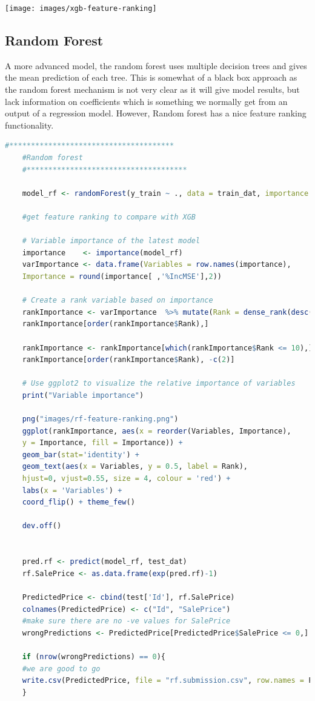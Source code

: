 \documentclass[sigconf]{acmart}
\begin{document}
	\begin{center}		
		\texttt{[image: images/xgb-feature-ranking]}	
	\end{center}
	
	\subsection{Random Forest}

	A more advanced model, the random forest uses multiple decision trees and gives the mean prediction of each tree. This is somewhat of a black box approach as the random forest mechanism is not very clear as it will give model results, but lack information on coefficients which is something we normally get from an output of a regression model. However, Random forest has a nice feature ranking functionality.
	
	\begin{lstlisting}[language=R]
	#**************************************
	#Random forest 
	#*************************************
	
	model_rf <- randomForest(y_train ~ ., data = train_dat, importance = T)
	
	#get feature ranking to compare with XGB
	
	# Variable importance of the latest model
	importance    <- importance(model_rf)
	varImportance <- data.frame(Variables = row.names(importance), 
	Importance = round(importance[ ,'%IncMSE'],2))
	
	# Create a rank variable based on importance
	rankImportance <- varImportance  %>% mutate(Rank = dense_rank(desc(Importance)))
	rankImportance[order(rankImportance$Rank),] 
	
	rankImportance <- rankImportance[which(rankImportance$Rank <= 10),]
	rankImportance[order(rankImportance$Rank), -c(2)] 
	
	# Use ggplot2 to visualize the relative importance of variables
	print("Variable importance")
	
	png("images/rf-feature-ranking.png")
	ggplot(rankImportance, aes(x = reorder(Variables, Importance), 
	y = Importance, fill = Importance)) +
	geom_bar(stat='identity') + 
	geom_text(aes(x = Variables, y = 0.5, label = Rank),
	hjust=0, vjust=0.55, size = 4, colour = 'red') +
	labs(x = 'Variables') +
	coord_flip() + theme_few()
	
	dev.off()
	
	
	pred.rf <- predict(model_rf, test_dat)
	rf.SalePrice <- as.data.frame(exp(pred.rf)-1)
	
	PredictedPrice <- cbind(test['Id'], rf.SalePrice)
	colnames(PredictedPrice) <- c("Id", "SalePrice")
	#make sure there are no -ve values for SalePrice
	wrongPredictions <- PredictedPrice[PredictedPrice$SalePrice <= 0,]
	
	if (nrow(wrongPredictions) == 0){
	#we are good to go
	write.csv(PredictedPrice, file = "rf.submission.csv", row.names = F)
	}
	\end{lstlisting}
	
\end{document}
